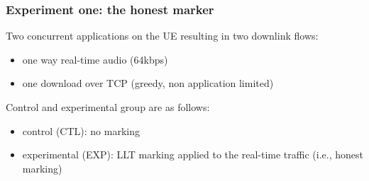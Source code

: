 \begin{frame}
\frametitle{Experiment one: the honest marker}

Two concurrent applications on the UE resulting in two downlink flows:
\begin{itemize}
\item one way real-time audio (64kbps)
\item one download over TCP (greedy, non application limited)
\end{itemize}
\vspace{.5cm}
Control and experimental group are as follows:
\begin{itemize}
\item control (CTL): no marking
\item experimental (EXP): LLT marking applied to the real-time traffic (i.e., honest marking)
\end{itemize}

\end{frame}
